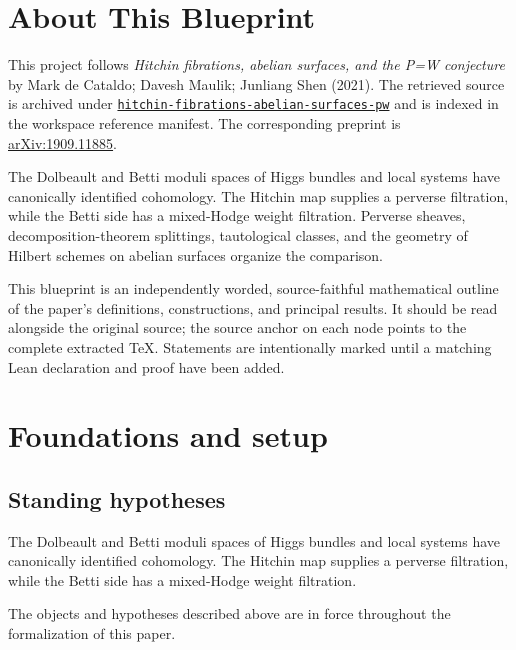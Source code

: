 

\chapter*{About This Blueprint}
\label{hitchin-fibrations-abelian-surfaces-pw-about}

This project follows \emph{Hitchin fibrations, abelian surfaces, and the P=W conjecture} by Mark de Cataldo; Davesh Maulik; Junliang Shen (2021). The
retrieved source is archived under
\href{../../../../../references/hitchin-fibrations-abelian-surfaces-pw/}{\texttt{hitchin-fibrations-abelian-surfaces-pw}} and is indexed in
the workspace reference manifest. The corresponding preprint is
\href{https://arxiv.org/abs/1909.11885}{arXiv:1909.11885}.

The Dolbeault and Betti moduli spaces of Higgs bundles and local systems have canonically identified cohomology. The Hitchin map supplies a perverse filtration, while the Betti side has a mixed-Hodge weight filtration. Perverse sheaves, decomposition-theorem splittings, tautological classes, and the geometry of Hilbert schemes on abelian surfaces organize the comparison.

This blueprint is an independently worded, source-faithful mathematical
outline of the paper's definitions, constructions, and principal results. It
should be read alongside the original source; the source anchor on each node
points to the complete extracted TeX. Statements are intentionally marked
\notready until a matching Lean declaration and proof have been added.

\chapter{Foundations and setup}
\label{chap:hitchin-fibrations-abelian-surfaces-pw-foundations}

\section{Standing hypotheses}
\label{sec:hitchin-fibrations-abelian-surfaces-pw-standing}

The Dolbeault and Betti moduli spaces of Higgs bundles and local systems have canonically identified cohomology. The Hitchin map supplies a perverse filtration, while the Betti side has a mixed-Hodge weight filtration.

\begin{convention}
\label{hitchin-fibrations-abelian-surfaces-pw-setup}
The objects and hypotheses described above are in force throughout the
formalization of this paper.
\notready
\end{convention}

